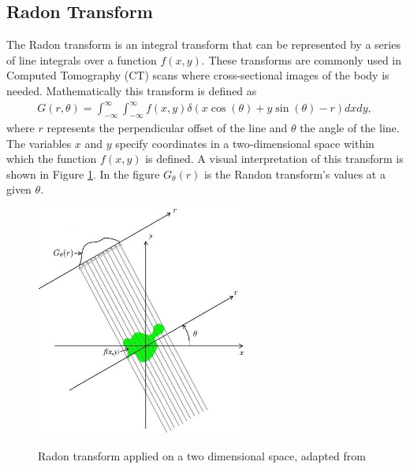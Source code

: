 \subsection{Radon Transform}
\label{sec:RadonTransform}
The Radon transform is an integral transform that can be represented by a series of line integrals over a function $f(x,y)$. These transforms are commonly used in Computed Tomography (CT) scans where cross-sectional images of the body is needed. Mathematically this transform is defined as 
\begin{align}
G(r,\theta) = \int_{-\infty}^{\infty} \int_{-\infty}^{\infty} f(x, y) \delta(x\cos(\theta) + y\sin(\theta) - r) dx dy,
\label{eqn:radon}
\end{align}where $r$ represents the perpendicular offset of the line and $\theta$ the angle of the line. The variables $x$ and $y$ specify coordinates in a two-dimensional space within which the function $f(x,y)$ is defined.  A visual interpretation of this transform is shown in Figure \ref{fig:RadonT}. In the figure $G_\theta(r)$ is the Randon transform's values at a given $\theta$.

\begin{figure}
  \centering
  \includegraphics[width=7cm]{RadonT}\\
  \caption{Radon transform applied on a two dimensional space, adapted from \citet{radon}}
  \label{fig:RadonT}
\end{figure}

